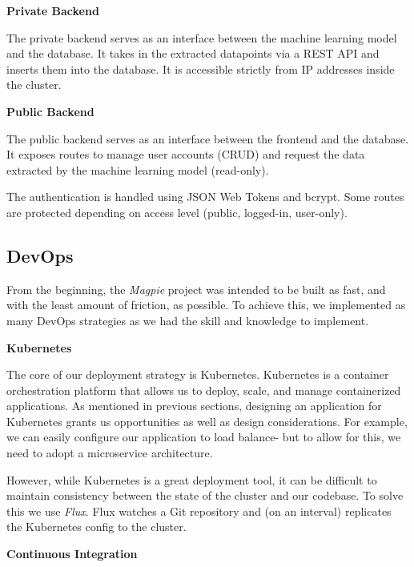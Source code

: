 \pagebreak{}

\noindent{}\textbf{Private Backend}

\noindent{}The private backend serves as an interface between the machine
learning model and the database. It takes in the extracted datapoints via a REST
API and inserts them into the database. It is accessible strictly from IP
addresses inside the cluster.

\noindent{}\textbf{Public Backend}

\noindent{}The public backend serves as an interface between the frontend and
the database. It exposes routes to manage user accounts (CRUD) and request the
data extracted by the machine learning model (read-only).

\noindent{}The authentication is handled using JSON Web Tokens and bcrypt. Some
routes are protected depending on access level (public, logged-in, user-only).

\subsection{DevOps}

From the beginning, the \textit{Magpie} project was intended to be built as
fast, and with the least amount of friction, as possible. To achieve this, we
implemented as many DevOps strategies as we had the skill and knowledge to
implement.

\noindent{}\textbf{Kubernetes}

\noindent{}The core of our deployment strategy is Kubernetes. Kubernetes is a
container orchestration platform that allows us to deploy, scale, and manage
containerized applications. As mentioned in previous sections, designing an
application for Kubernetes grants us opportunities as well as design
considerations. For example, we can easily configure our application to load
balance- but to allow for this, we need to adopt a microservice architecture.

\noindent{}However, while Kubernetes is a great deployment tool, it can be difficult to
maintain consistency between the state of the cluster and our codebase. To solve
this we use \textit{Flux}. Flux watches a Git repository and (on an interval)
replicates the Kubernetes config to the cluster.

\pagebreak{}

\noindent{}\textbf{Continuous Integration}

